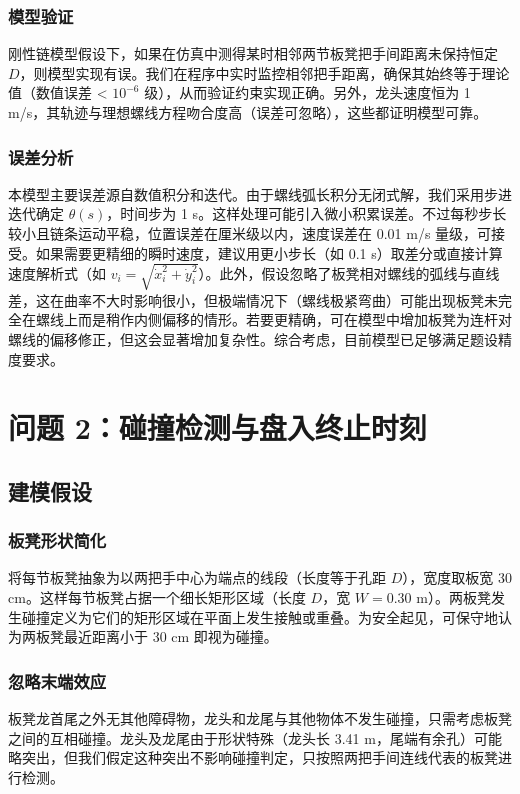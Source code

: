 \documentclass[UTF8]{ctexart}
\begin{document}
\subsubsection{模型验证}
刚性链模型假设下，如果在仿真中测得某时相邻两节板凳把手间距离未保持恒定 $D$，则模型实现有误。我们在程序中实时监控相邻把手距离，确保其始终等于理论值（数值误差 < $10^{-6}$ 级），从而验证约束实现正确。另外，龙头速度恒为 1 m/s，其轨迹与理想螺线方程吻合度高（误差可忽略），这些都证明模型可靠。

\subsubsection{误差分析}
本模型主要误差源自数值积分和迭代。由于螺线弧长积分无闭式解，我们采用步进迭代确定 $\theta(s)$，时间步为 1 s。这样处理可能引入微小积累误差。不过每秒步长较小且链条运动平稳，位置误差在厘米级以内，速度误差在 0.01 m/s 量级，可接受。如果需要更精细的瞬时速度，建议用更小步长（如 0.1 s）取差分或直接计算速度解析式（如 $v_i=\sqrt{\dot{x}_i^2+\dot{y}_i^2}$）。此外，假设忽略了板凳相对螺线的弧线与直线差，这在曲率不大时影响很小，但极端情况下（螺线极紧弯曲）可能出现板凳未完全在螺线上而是稍作内侧偏移的情形。若要更精确，可在模型中增加板凳为连杆对螺线的偏移修正，但这会显著增加复杂性。综合考虑，目前模型已足够满足题设精度要求。

\newpage

\section{问题 2：碰撞检测与盘入终止时刻}

\subsection{建模假设}

\subsubsection{板凳形状简化}
将每节板凳抽象为以两把手中心为端点的线段（长度等于孔距 $D$），宽度取板宽 30 cm。这样每节板凳占据一个细长矩形区域（长度 $D$，宽 $W=0.30$ m）。两板凳发生碰撞定义为它们的矩形区域在平面上发生接触或重叠。为安全起见，可保守地认为两板凳最近距离小于 30 cm 即视为碰撞。

\subsubsection{忽略末端效应}
板凳龙首尾之外无其他障碍物，龙头和龙尾与其他物体不发生碰撞，只需考虑板凳之间的互相碰撞。龙头及龙尾由于形状特殊（龙头长 3.41 m，尾端有余孔）可能略突出，但我们假定这种突出不影响碰撞判定，只按照两把手间连线代表的板凳进行检测。
\end{document}
